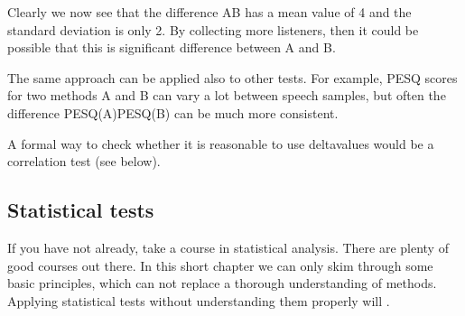 \documentclass[letterpaper,10pt,english]{jupyterBook}
\begin{document}
\sphinxAtStartPar
Clearly we now see that the difference A\sphinxhyphen{}B has a mean value of 4 and the
standard deviation is only 2. By collecting more listeners, then it
could be possible that this is significant difference between A and B.

\sphinxAtStartPar
The same approach can be applied also to other tests. For example, PESQ
scores for two methods A and B can vary a lot between speech samples,
but often the difference PESQ(A)\sphinxhyphen{}PESQ(B) can be much more consistent.

\sphinxAtStartPar
A formal way to check whether it is reasonable to use delta\sphinxhyphen{}values would
be a correlation test (see below).


\subsection{Statistical tests}
\label{\detokenize{Evaluation/Analysis_of_evaluation_results:statistical-tests}}
\sphinxAtStartPar
{} If you have not already,  take a course in
statistical analysis. There are plenty of good courses out there. In
this short chapter we can only skim through some basic principles, which
can not replace a thorough understanding of methods. Applying
statistical tests without understanding them properly will .
\end{document}

